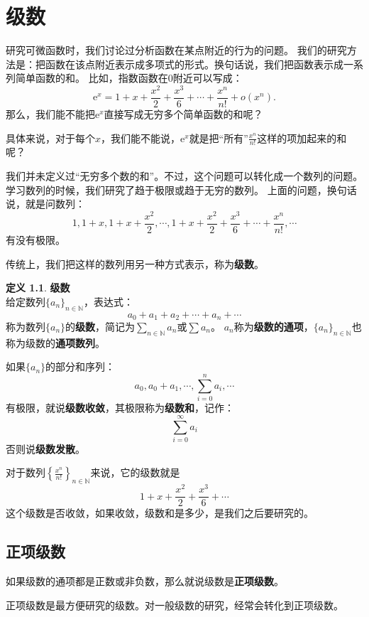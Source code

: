 \documentclass[12pt,UTF8]{ctexbook}
\newcommand{\olim}[1]{\mathit{o}\left(#1\right)}  %
\theoremstyle{definition}
\newtheorem{df}{定义}[section]
\theoremstyle{plain}
\begin{document}
\chapter{级数}
研究可微函数时，我们讨论过分析函数在某点附近的行为的问题。
我们的研究方法是：把函数在该点附近表示成多项式的形式。换句话说，我们把函数表示成一系列简单函数的和。
比如，指数函数在$0$附近可以写成：
$$\mathrm{e}^x = 1 + x + \frac{x^2}{2} + \frac{x^3}{6} + \cdots + \frac{x^n}{n!} + \olim{x^n}.$$
那么，我们能不能把$\mathrm{e}^x$直接写成无穷多个简单函数的和呢？

具体来说，对于每个$x$，我们能不能说，$\mathrm{e}^x$就是把“所有”$\frac{x^n}{n!}$这样的项加起来的和呢？

我们并未定义过“无穷多个数的和”。不过，这个问题可以转化成一个数列的问题。
学习数列的时候，我们研究了趋于极限或趋于无穷的数列。
上面的问题，换句话说，就是问数列：
$$ 1, 1+x, 1+x + \frac{x^2}{2}, \cdots , 1 + x + \frac{x^2}{2} + \frac{x^3}{6} + \cdots + \frac{x^n}{n!}, \cdots $$
有没有极限。

传统上，我们把这样的数列用另一种方式表示，称为\textbf{级数}。

\begin{df}{\textbf{级数}}
    \mbox{} \\
    给定数列$\{a_n\}_{n\in\mathbb{N}}$，表达式：
    $$ a_0 + a_1 + a_2 + \cdots + a_n + \cdots $$
    称为数列$\{a_n\}$的\textbf{级数}，简记为$\sum_{n\in\mathbb{N}} a_n$或$\sum a_n$。
    $a_n$称为\textbf{级数的通项}，$\{a_n\}_{n\in\mathbb{N}}$也称为级数的\textbf{通项数列}。
    
    如果$\{a_n\}$的部分和序列：
    $$ a_0, a_0 + a_1, \cdots , \sum_{i=0}^n a_i, \cdots $$
    有极限，就说\textbf{级数收敛}，其极限称为\textbf{级数和}，记作：
    $$ \sum_{i=0}^\infty a_i $$
    否则说\textbf{级数发散}。
    
\end{df}

对于数列$\left\{\frac{x^n}{n!}\right\}_{n\in\mathbb{N}}$来说，它的级数就是
$$ 1 + x + \frac{x^2}{2} + \frac{x^3}{6} + \cdots $$
这个级数是否收敛，如果收敛，级数和是多少，是我们之后要研究的。

\section{正项级数}

如果级数的通项都是正数或非负数，那么就说级数是\textbf{正项级数}。

正项级数是最方便研究的级数。对一般级数的研究，经常会转化到正项级数。
\end{document}
